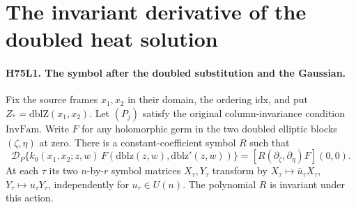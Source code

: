 \section{The invariant derivative of the doubled heat solution}

\paragraph{H75L1. The symbol after the doubled substitution and the Gaussian.}
\label{claim:H75L1}
Fix the source frames $x_1,x_2$ in their domain, the ordering
$\mathrm{idx}$, and put $Z_*=\mathrm{dblZ}(x_1,x_2)$.
Let $(P_j)$ satisfy the original column-invariance condition
$\mathrm{InvFam}$. Write $F$ for any holomorphic germ in the two
doubled elliptic blocks $(\zeta,\eta)$ at zero. There is a
constant-coefficient symbol $R$ such that
\[
 \mathcal D_P\{k_0(x_1,x_2;z,w)\,
      F(\mathrm{dblz}(z,w),\mathrm{dblz}'(z,w))\}
  = [R(\partial_\zeta,\partial_\eta)F](0,0).
\]
At each $\tau$ its two $n$-by-$r$ symbol matrices $X_\tau,Y_\tau$
transform by $X_\tau\mapsto\bar u_\tau X_\tau$,
$Y_\tau\mapsto u_\tau Y_\tau$, independently for
$u_\tau\in U(n)$. The polynomial $R$ is invariant under this
action.

